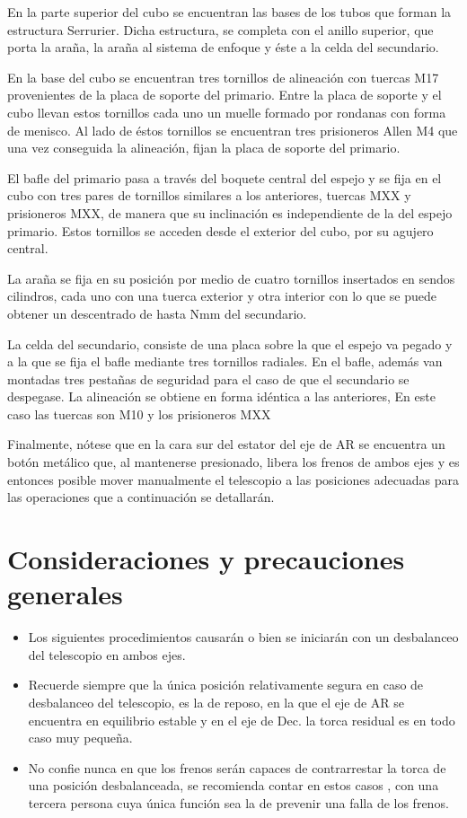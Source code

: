 En la parte superior del cubo se encuentran las bases de los tubos que forman la estructura Serrurier. Dicha estructura, se completa con el anillo superior, que porta la araña, la araña al sistema de enfoque y éste a la celda del secundario. 

En la base del cubo se encuentran tres tornillos de alineación con tuercas M17 provenientes de la placa de soporte del primario. Entre la placa de soporte y el cubo llevan estos tornillos cada uno un muelle formado por rondanas con forma de menisco. Al lado de éstos tornillos se encuentran tres prisioneros Allen M4 que una vez conseguida la alineación, fijan la placa de soporte del primario.

El bafle del primario pasa a través del boquete central del espejo y se fija en el cubo con tres pares de tornillos similares a los anteriores, tuercas MXX y prisioneros MXX, de manera que su inclinación es independiente de la del espejo primario. Estos tornillos se acceden desde el exterior del cubo, por su agujero central.

La araña se fija en su posición por medio de cuatro tornillos insertados en sendos cilindros, cada uno con una tuerca exterior y otra interior con lo que se puede obtener un descentrado de hasta Nmm del secundario.

La celda del secundario, consiste de una placa sobre la que el espejo va pegado y a la que se fija el bafle mediante tres tornillos radiales. En el bafle, además van montadas tres pestañas de seguridad para el caso de que el secundario se despegase. La alineación se obtiene en forma idéntica a las anteriores, En este caso las tuercas son M10 y los prisioneros MXX

Finalmente, nótese que en la cara sur del estator del eje de AR se encuentra un botón metálico que, al mantenerse presionado, libera los frenos de ambos ejes y es entonces posible mover manualmente el telescopio a las posiciones adecuadas para las operaciones que a continuación se detallarán.

\section{Consideraciones y precauciones generales}

\begin{itemize}
\item Los siguientes procedimientos causarán o bien se iniciarán con un desbalanceo del telescopio en ambos ejes.
\item Recuerde siempre que la única posición relativamente segura en caso de desbalanceo del telescopio, es la de reposo, en la que el eje de AR se encuentra en equilibrio estable y en el eje de Dec. la torca residual es en todo caso muy pequeña.
\item No confie nunca en que los frenos serán capaces de contrarrestar la torca de una posición desbalanceada, se recomienda contar en estos casos , con una tercera persona cuya única función sea la de prevenir una falla de los frenos.
\end{itemize}

